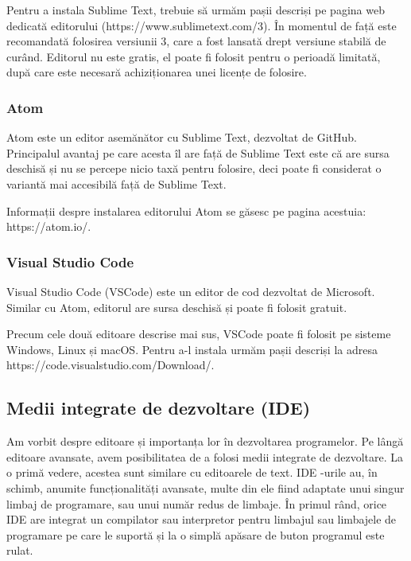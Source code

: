 Pentru a instala Sublime Text, trebuie să urmăm pașii descriși pe pagina web
dedicată editorului (https://www.sublimetext.com/3). În momentul de față este
recomandată folosirea versiunii 3, care a fost lansată drept versiune stabilă de
curând. Editorul nu este gratis, el poate fi folosit pentru o perioadă limitată,
după care este necesară achiziționarea unei licențe de folosire.

\subsubsection{Atom}
\label{sec:appdev:dev:editor-gui:atom}

Atom este un editor asemănător cu Sublime Text, dezvoltat de GitHub. Principalul
avantaj pe care acesta îl are față de Sublime Text este că are sursa deschisă și
nu se percepe nicio taxă pentru folosire, deci poate fi considerat o variantă
mai accesibilă față de Sublime Text.

Informații despre instalarea editorului Atom se găsesc pe pagina acestuia:
https://atom.io/.

\subsubsection{Visual Studio Code}
\label{sec:appdev:dev:editor-gui:vscode}

Visual Studio Code (VSCode) este un editor de cod dezvoltat de Microsoft.
Similar cu Atom, editorul are sursa deschisă și poate fi folosit gratuit.

Precum cele două editoare descrise mai sus, VSCode poate fi folosit pe sisteme
Windows, Linux și macOS. Pentru a-l instala urmăm pașii descriși la
adresa https://code.visualstudio.com/Download/.

\subsection{Medii integrate de dezvoltare (IDE)}
\label{sec:appdev:dev:ide}

Am vorbit despre editoare și importanța lor în dezvoltarea programelor. Pe lângă
editoare avansate, avem posibilitatea de a folosi medii integrate de dezvoltare.
La o primă vedere, acestea sunt similare cu editoarele de text. IDE
-urile au, în schimb, anumite
funcționalități avansate, multe din ele fiind adaptate unui singur limbaj de
programare, sau unui număr redus de limbaje. În primul rând, orice IDE are
integrat un compilator sau interpretor pentru limbajul sau limbajele de
programare pe care le suportă și la o simplă apăsare de buton programul este
rulat.

